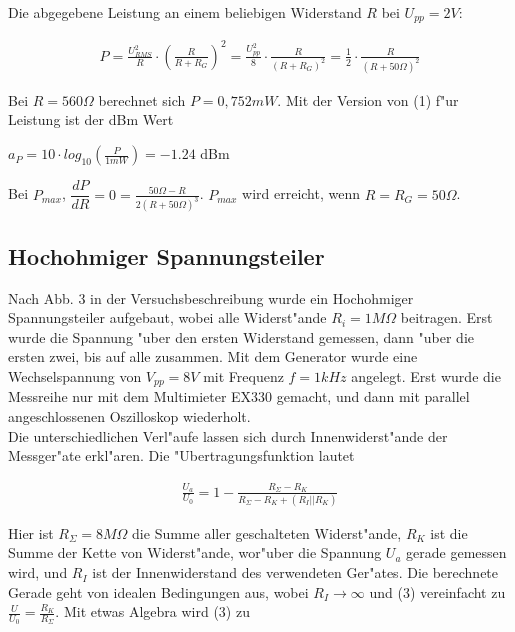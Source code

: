 \documentclass[10pt]{article}
\begin{document}
Die abgegebene Leistung an einem beliebigen Widerstand $R$ bei $U_{pp}=2V$:

\begin{eqnarray}
 P = \frac{U_{RMS}^2}{R} \cdot (\frac{R}{R+R_G})^2 = \frac{U_{pp}^2}{8} \cdot \frac{R}{(R+R_G)^2} = \frac{1}{2} \cdot \frac{R}{(R+50\Omega)^2}
\end{eqnarray}

Bei $R=560 \Omega$ berechnet sich $P=0,752mW$. Mit der Version von (1) f"ur Leistung ist der dBm Wert 
\begin{center}
$a_P = 10 \cdot log_{10}(\frac{P}{1mW})=-1.24$ dBm
\end{center}

Bei $P_{max}$, $\dfrac{dP}{dR}=0=\frac{50 \Omega - R}{2(R+50 \Omega)^3}$. $P_{max}$ wird erreicht, wenn $R=R_G=50 \Omega$.


\subsection{Hochohmiger Spannungsteiler}

Nach Abb. 3 in der Versuchsbeschreibung wurde ein Hochohmiger Spannungsteiler aufgebaut, wobei alle Widerst"ande $R_i=1M\Omega$ beitragen. Erst wurde die Spannung "uber den ersten Widerstand gemessen, dann "uber die ersten zwei, bis auf alle zusammen. Mit dem Generator wurde eine Wechselspannung von $V_{pp}=8V$ mit Frequenz $f=1kHz$ angelegt. Erst wurde die Messreihe nur mit dem Multimieter EX330 gemacht, und dann mit parallel angeschlossenen Oszilloskop wiederholt.\\


Die unterschiedlichen Verl"aufe lassen sich durch Innenwiderst"ande der Messger"ate erkl"aren. Die "Ubertragungsfunktion lautet

\begin{eqnarray}
 \frac{U_a}{U_0} = 1-\frac{R_{\Sigma}-R_K}{R_{\Sigma}-R_K+(R_I \vert \vert R_K)}
\end{eqnarray}

Hier ist $R_{\Sigma}=8M\Omega$ die Summe aller geschalteten Widerst"ande, $R_K$ ist die Summe der Kette von Widerst"ande, wor"uber die Spannung $U_a$ gerade gemessen wird, und $R_I$ ist der Innenwiderstand des verwendeten Ger"ates. Die berechnete Gerade geht von idealen Bedingungen aus, wobei $R_I \rightarrow \infty$ und (3) vereinfacht zu $\frac{U}{U_0} = \frac{R_K}{R_{\Sigma}}$. Mit etwas Algebra wird (3) zu
\end{document}
